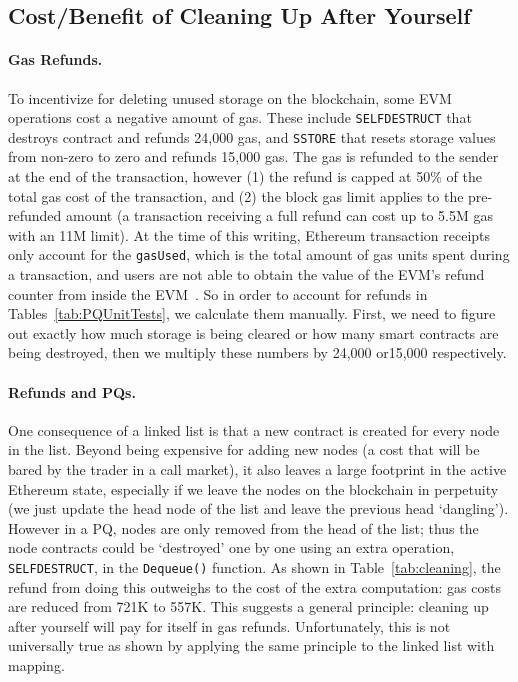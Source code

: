 
\subsection{Cost/Benefit of Cleaning Up After Yourself}
\label{sec:gasrefund}



\paragraph{Gas Refunds.}\label{para-ref}To incentivize for deleting unused storage on the blockchain, some EVM operations cost a negative amount of gas. These include \texttt{SELFDESTRUCT} that destroys contract and refunds 24,000 gas, and  \texttt{SSTORE} that resets storage values from non-zero to zero and refunds 15,000 gas. The gas is refunded to the sender at the end of the transaction, however (1) the refund is capped at 50\% of the total gas cost of the transaction, and (2) the block gas limit applies to the pre-refunded amount (\ie a transaction receiving a full refund can cost up to 5.5M gas with an 11M limit).  At the time of this writing, Ethereum transaction receipts only account for the \texttt{gasUsed}, which is the total amount of gas units spent during a transaction, and users are not able to obtain the value of the EVM's refund counter from inside the EVM~\cite{signer2018gas}. So in order to account for refunds in  Tables~\ref{tab:PQUnitTests}, we calculate them manually. First, we need to figure out exactly how much storage is being cleared or how many smart contracts are being destroyed, then we multiply these numbers by 24,000 or15,000 respectively.

\paragraph{Refunds and PQs.}

One consequence of a linked list is that a new contract is created for every node in the list. Beyond being expensive for adding new nodes (a cost that will be bared by the trader in a call market), it also leaves a large footprint in the active Ethereum state, especially if we leave the nodes on the blockchain in perpetuity (\ie we just update the head node of the list and leave the previous head `dangling'). However in a PQ, nodes are only removed from the head of the list; thus the node contracts could be `destroyed' one by one using an extra operation, \texttt{SELFDESTRUCT}, in the \texttt{Dequeue()} function. As shown in Table~\ref{tab:cleaning}, the refund from doing this outweighs to the cost of the extra computation: gas costs are reduced from 721K to 557K.  This suggests a general principle: cleaning up after yourself will pay for itself in gas refunds. Unfortunately, this is not universally true as shown by applying the same principle to the linked list with mapping.

